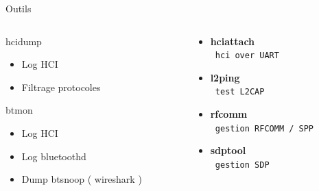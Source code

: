 \begin{frame}[fragile]
\begin{center}\huge Outils\end{center}
	\begin{columns}[t]
		\begin{column}{0.50\linewidth}
			\begin{block}{hcidump}
				\begin{itemize}
					\item Log HCI
					\item Filtrage protocoles
				\end{itemize}
			\end{block}
			\begin{block}{btmon}
				\begin{itemize}
					\item Log HCI
					\item Log bluetoothd
					\item Dump btsnoop ( wireshark )
				\end{itemize}
			\end{block}
		\end{column}
		\begin{column}{0.50\linewidth}
			\begin{itemize}
				\item \textbf{hciattach} \\ \verb+ hci over UART+
				\item \textbf{l2ping} \\ \verb+ test L2CAP+
				\item \textbf{rfcomm} \\ \verb+ gestion RFCOMM / SPP+
				\item \textbf{sdptool} \\ \verb+ gestion SDP+
			\end{itemize}
		\end{column}
	\end{columns}
\end{frame}


